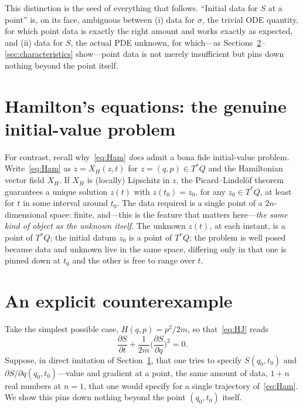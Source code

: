 \documentclass[11pt]{article}
\newcommand{\dd}[2]{\frac{\partial #1}{\partial #2}}
\begin{document}
This distinction is the seed of everything that follows. ``Initial data for $S$ at a point'' is, on its face, ambiguous between (i) data for $\sigma$, the trivial ODE quantity, for which point data is exactly the right amount and works exactly as expected, and (ii) data for $S$, the actual PDE unknown, for which---as Sections~\ref{sec:counterexample}--\ref{sec:characteristics} show---point data is not merely insufficient but pins down nothing beyond the point itself.

\section{Hamilton's equations: the genuine initial-value problem}
\label{sec:ham-ivp}

For contrast, recall why~\eqref{eq:Ham} \emph{does} admit a bona fide initial-value problem. Write~\eqref{eq:Ham} as $\dot z = X_H(z,t)$ for $z=(q,p)\in T^*Q$ and the Hamiltonian vector field $X_H$. If $X_H$ is (locally) Lipschitz in $z$, the Picard--Lindel\"of theorem guarantees a unique solution $z(t)$ with $z(t_0)=z_0$, for any $z_0\in T^*Q$, at least for $t$ in some interval around $t_0$. The data required is a single point of a $2n$-dimensional space: finite, and---this is the feature that matters here---\emph{the same kind of object as the unknown itself}. The unknown $z(t)$, at each instant, is a point of $T^*Q$; the initial datum $z_0$ is a point of $T^*Q$; the problem is well posed because data and unknown live in the same space, differing only in that one is pinned down at $t_0$ and the other is free to range over $t$.

\section{An explicit counterexample}
\label{sec:counterexample}

Take the simplest possible case, $H(q,p)=p^2/2m$, so that~\eqref{eq:HJ} reads
\begin{equation}
\label{eq:HJ-free}
\dd{S}{t} + \frac{1}{2m}\Big(\dd{S}{q}\Big)^{\!2} = 0 .
\end{equation}
Suppose, in direct imitation of Section~\ref{sec:ham-ivp}, that one tries to specify $S(q_0,t_0)$ and $\partial S/\partial q(q_0,t_0)$---value and gradient at a point, the same amount of data, $1+n$ real numbers at $n=1$, that one would specify for a single trajectory of~\eqref{eq:Ham}. We show this pins down nothing beyond the point $(q_0,t_0)$ itself.
\end{document}

